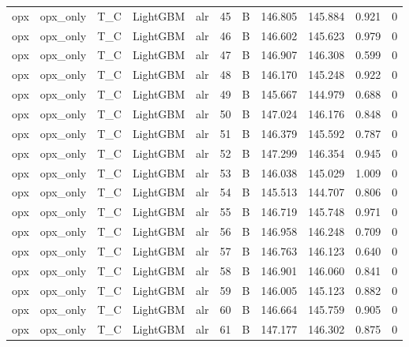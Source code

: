 \begin{longtable}{lllllrrrrrr}
opx & opx\_only & T\_C & LightGBM & alr & 45 & B & 146.805 & 145.884 & 0.921 & 0 \\
opx & opx\_only & T\_C & LightGBM & alr & 46 & B & 146.602 & 145.623 & 0.979 & 0 \\
opx & opx\_only & T\_C & LightGBM & alr & 47 & B & 146.907 & 146.308 & 0.599 & 0 \\
opx & opx\_only & T\_C & LightGBM & alr & 48 & B & 146.170 & 145.248 & 0.922 & 0 \\
opx & opx\_only & T\_C & LightGBM & alr & 49 & B & 145.667 & 144.979 & 0.688 & 0 \\
opx & opx\_only & T\_C & LightGBM & alr & 50 & B & 147.024 & 146.176 & 0.848 & 0 \\
opx & opx\_only & T\_C & LightGBM & alr & 51 & B & 146.379 & 145.592 & 0.787 & 0 \\
opx & opx\_only & T\_C & LightGBM & alr & 52 & B & 147.299 & 146.354 & 0.945 & 0 \\
opx & opx\_only & T\_C & LightGBM & alr & 53 & B & 146.038 & 145.029 & 1.009 & 0 \\
opx & opx\_only & T\_C & LightGBM & alr & 54 & B & 145.513 & 144.707 & 0.806 & 0 \\
opx & opx\_only & T\_C & LightGBM & alr & 55 & B & 146.719 & 145.748 & 0.971 & 0 \\
opx & opx\_only & T\_C & LightGBM & alr & 56 & B & 146.958 & 146.248 & 0.709 & 0 \\
opx & opx\_only & T\_C & LightGBM & alr & 57 & B & 146.763 & 146.123 & 0.640 & 0 \\
opx & opx\_only & T\_C & LightGBM & alr & 58 & B & 146.901 & 146.060 & 0.841 & 0 \\
opx & opx\_only & T\_C & LightGBM & alr & 59 & B & 146.005 & 145.123 & 0.882 & 0 \\
opx & opx\_only & T\_C & LightGBM & alr & 60 & B & 146.664 & 145.759 & 0.905 & 0 \\
opx & opx\_only & T\_C & LightGBM & alr & 61 & B & 147.177 & 146.302 & 0.875 & 0 \\
\end{longtable}
